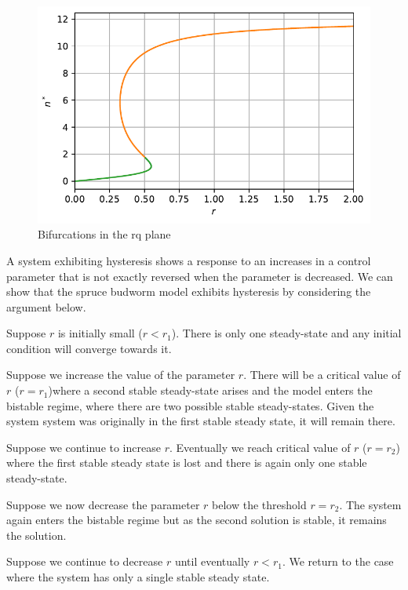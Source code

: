 \documentclass[
  letterpaper,
  DIV=11,
  numbers=noendperiod]{scrreprt}
\begin{document}
\begin{figure}

{\centering \includegraphics{SinglePopODEMOdels_files/figure-pdf/fig-sprucebudworm-bfc-output-1.pdf}

}

\caption{\label{fig-sprucebudworm-bfc}Bifurcations in the rq plane}

\end{figure}

A system exhibiting hysteresis shows a response to an increases in a
control parameter that is not exactly reversed when the parameter is
decreased. We can show that the spruce budworm model exhibits hysteresis
by considering the argument below.

Suppose \(r\) is initially small (\(r<r_1\)). There is only one
steady-state and any initial condition will converge towards it.

Suppose we increase the value of the parameter \(r\). There will be a
critical value of \(r\) (\(r=r_1\))where a second stable steady-state
arises and the model enters the bistable regime, where there are two
possible stable steady-states. Given the system system was originally in
the first stable steady state, it will remain there.

Suppose we continue to increase \(r\). Eventually we reach critical
value of \(r\) (\(r=r_2\)) where the first stable steady state is lost
and there is again only one stable steady-state.

Suppose we now decrease the parameter \(r\) below the threshold
\(r=r_2\). The system again enters the bistable regime but as the second
solution is stable, it remains the solution.

Suppose we continue to decrease \(r\) until eventually \(r<r_1\). We
return to the case where the system has only a single stable steady
state.
\end{document}
